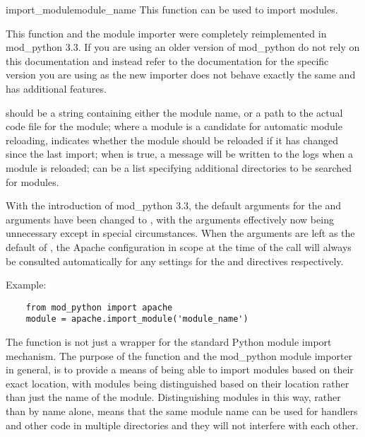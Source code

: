 \begin{funcdesc}{import_module}{module_name}
  This function can be used to import modules.

\begin{notice}
  This function and the module importer were completely reimplemented in
  mod_python 3.3. If you are using an older version of mod_python do not
  rely on this documentation and instead refer to the documentation for
  the specific version you are using as the new importer does not behave
  exactly the same and has additional features.
\end{notice}

   should be a string containing either the module name,
  or a path to the actual code file for the module; where a module is a
  candidate for automatic module reloading,  indicates
  whether the module should be reloaded if it has changed since the last
  import; when  is true, a message will be written to the logs
  when a module is reloaded;  can be a list specifying additional
  directories to be searched for modules.

  With the introduction of mod_python 3.3, the default arguments for the
   and  arguments have been changed to
  , with the arguments effectively now being unnecessary except
  in special circumstances. When the arguments are left as the default of
  , the Apache configuration in scope at the time of the call
  will always be consulted automatically for any settings for the
   and  directives respectively.

  Example:

  \begin{verbatim}
    from mod_python import apache
    module = apache.import_module('module_name')
  \end{verbatim}

  The  function is not just a wrapper for the
  standard Python module import mechanism. The purpose of the function and
  the mod_python module importer in general, is to provide a means of being
  able to import modules based on their exact location, with modules being
  distinguished based on their location rather than just the name of the
  module. Distinguishing modules in this way, rather than by name alone,
  means that the same module name can be used for handlers and other code
  in multiple directories and they will not interfere with each other.


\end{funcdesc}
